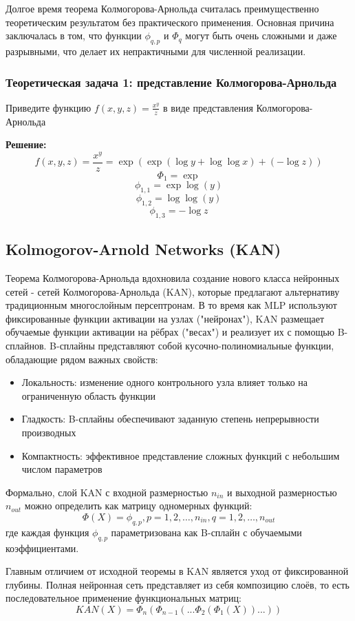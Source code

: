 Долгое время теорема Колмогорова-Арнольда считалась преимущественно теоретическим результатом без практического применения. Основная причина заключалась в том, что функции $\phi_{q,p}$ и $\Phi_q$ могут быть очень сложными и даже разрывными, что делает их непрактичными для численной реализации.

\subsubsection{Теоретическая задача 1: представление Колмогорова-Арнольда}
Приведите функцию $ f(x,y,z) = \frac{x^y}{z} $ в виде представления Колмогорова-Арнольда

\textbf{Решение:}
\[
f(x,y,z) = \frac{x^y}{z} = \exp(\exp(\log y + \log \log x) + (-\log z))
\]
\[
\Phi_1 = \exp
\]
\[
\phi_{1, 1} = \exp\log(y)
\]
\[
\phi_{1, 2} = \log\log(y)
\]
\[
\phi_{1, 3} = -\log z
\]

\subsection{Kolmogorov-Arnold Networks (KAN)}

Теорема Колмогорова-Арнольда вдохновила создание нового класса нейронных сетей - сетей Колмогорова-Арнольда (KAN), которые предлагают альтернативу традиционным многослойным персептронам. В то время как MLP используют фиксированные функции активации на узлах ("нейронах"), KAN размещает обучаемые функции активации на рёбрах ("весах") и реализует их с помощью B-сплайнов.
B-сплайны представляют собой кусочно-полиномиальные функции, обладающие рядом важных свойств:
\begin{itemize}
    \item Локальность: изменение одного контрольного узла влияет только на ограниченную область функции
    \item Гладкость: B-сплайны обеспечивают заданную степень непрерывности производных
    \item Компактность: эффективное представление сложных функций с небольшим числом параметров
\end{itemize}

Формально, слой KAN с входной размерностью $n_{in}$ и выходной размерностью $n_{out}$ можно определить как матрицу одномерных функций:
\[
\Phi(X) = {\phi_{q,p}}, p = 1,2,\ldots,n_{in}, q = 1,2,\ldots,n_{out}
\]
где каждая функция $\phi_{q,p}$ параметризована как B-сплайн с обучаемыми коэффициентами.

Главным отличием от исходной теоремы в KAN является уход от фиксированной глубины. Полная нейронная сеть представляет из себя композицию слоёв, то есть последовательное применение функциональных матриц:
\[
KAN(X) = \Phi_n(\Phi_{n - 1}( ...\Phi_2(\Phi_1(X))...))
\]


